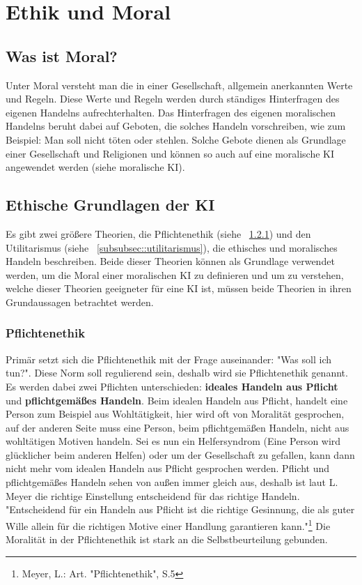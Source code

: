 \section{Ethik und Moral}\label{sec:ethik und moral}

\subsection{Was ist Moral?}\label{subsec::moral}

Unter Moral versteht man die in einer Gesellschaft, allgemein anerkannten Werte und Regeln.
Diese Werte und Regeln werden durch ständiges Hinterfragen des eigenen Handelns aufrechterhalten.
Das Hinterfragen des eigenen moralischen Handelns beruht dabei auf Geboten, die solches Handeln vorschreiben,
wie zum Beispiel: Man soll nicht töten oder stehlen.
Solche Gebote dienen als Grundlage einer Gesellschaft und Religionen und können so auch auf
eine moralische KI angewendet werden (siehe moralische KI). %


\subsection{Ethische Grundlagen der KI}\label{subsec::ethische grundlagen}

Es gibt zwei größere Theorien, die Pflichtenethik (siehe ~\ref{subsubsec::pflichtenethik}) und den Utilitarismus (siehe ~\ref{subsubsec::utilitarismus}),
die ethisches und moralisches Handeln beschreiben.
Beide dieser Theorien können als Grundlage verwendet werden, um die Moral einer moralischen KI zu definieren und um zu verstehen, welche
dieser Theorien geeigneter für eine KI ist, müssen beide Theorien in ihren Grundaussagen betrachtet werden.

\subsubsection{Pflichtenethik}\label{subsubsec::pflichtenethik}

Primär setzt sich die Pflichtenethik mit der Frage auseinander: "Was soll ich tun?".
Diese Norm soll regulierend sein, deshalb wird sie Pflichtenethik genannt.
Es werden dabei zwei Pflichten unterschieden:
\textbf{ideales Handeln aus Pflicht} und \textbf{pflichtgemäßes Handeln}.
Beim idealen Handeln aus Pflicht, handelt eine Person zum Beispiel aus Wohltätigkeit,
hier wird oft von Moralität gesprochen, auf der
anderen Seite muss eine Person, beim pflichtgemäßen Handeln, nicht aus wohltätigen Motiven handeln.
Sei es nun ein Helfersyndrom (Eine Person wird glücklicher beim anderen Helfen) oder um der Gesellschaft zu gefallen,
kann dann nicht mehr vom idealen Handeln aus Pflicht gesprochen werden.
Pflicht und pflichtgemäßes Handeln sehen von außen immer gleich aus, deshalb ist laut L. Meyer die richtige
Einstellung entscheidend für das richtige Handeln.
"Entscheidend für ein Handeln aus Pflicht ist die richtige Gesinnung,
die als guter Wille allein für die richtigen Motive einer Handlung garantieren kann."\footnote{ Meyer, L.: Art. "Pflichtenethik", S.5}
Die Moralität in der Pflichtenethik ist stark an die Selbstbeurteilung gebunden.


